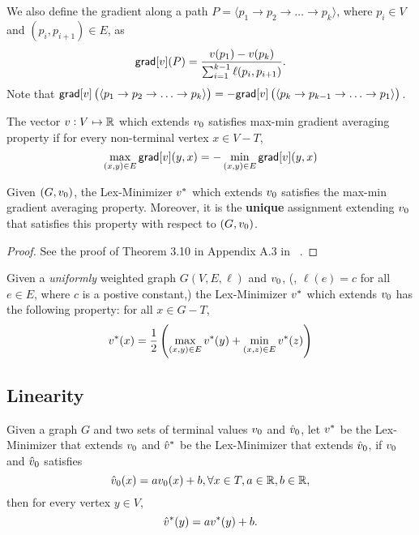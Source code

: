 \documentclass[12pt]{amsart}
\newcommand{\grad}{\ensuremath{\mathsf{grad}}}
\renewcommand{\path}[1]{\ensuremath{\langle {#1} \rangle}}
\begin{document}
We also define the gradient along a path $P = \path{p_1 \to p_2 \to \hdots \to p_k}$, where $p_i\in V$ and $(p_i, p_{i+1})\in E$, as $$\grad[\V{v}](P) = \frac{\V{v}(p_1) - \V{v}(p_k)}{\sum_{i=1}^{k-1}\ell(p_i, p_{i+1})}.$$ Note that $\grad[\V{v}]\paren{\path{p_1 \to p_2 \to \hdots \to p_k}} = -\grad[\V{v}]\paren{\path{p_k \to p_{k-1} \to \hdots \to p_1}}$.

\begin{definition}\label{def:maxmingradavgprop}
The vector $v: V\mapsto \mathbb R$ which extends $v_0$ satisfies max-min gradient averaging property if for every non-terminal vertex $x\in V-T$,
\begin{equation}\label{eq:maxmingradavgprop}
  \max_{(x,y)\in E}\grad[\V{v}](y,x) = -\min_{(x,y)\in E}\grad[\V{v}](y,x)
\end{equation}
\end{definition}

\begin{theorem}\label{thm:lexmaxminavgprop}
Given $(G, v_0)$, the Lex-Minimizer $v^*$ which extends $v_0$ satisfies the max-min gradient averaging property. Moreover, it is the \textbf{unique} assignment extending $v_0$ that satisfies this property with respect to $(G, v_0)$.
\end{theorem}
\begin{proof}
See the proof of Theorem 3.10 in Appendix A.3 in ~\cite{KRSS15}.
\end{proof}

\begin{corollary}\label{cor:lexunwtdprop}
Given a \emph{uniformly} weighted graph $G(V,E,\ell)$ and $v_0$, (\ie, $\ell(e) = c$ for all $e\in E$, where $c$ is a postive constant,) the Lex-Minimizer $v^*$ which extends $v_0$ has the following property: for all $x\in G - T$,
\begin{equation}\label{eq:lexunwtdprop}
  v^*(x) = \frac{1}{2} \left({ \max_{(x,y)\in E} v^*(y) + \min_{(x,z)\in E} v^*(z) }\right)
\end{equation}
\end{corollary}

\subsection{Linearity}
\begin{theorem}\label{thm:lexlinearity}
Given a graph $G$ and two sets of terminal values $v_0$ and $\hat{v}_0$, let $v^*$ be the Lex-Minimizer that extends $v_0$ and $\hat{v}^*$ be the Lex-Minimizer that extends $\hat{v}_0$, if $v_0$ and $\hat{v}_0$ satisfies $$\hat{v}_0(x) = av_0(x) + b, \forall x\in T, a\in \mathbb R, b\in \mathbb R,$$ then for every vertex $y\in V$, $$\hat{v}^*(y) = av^*(y) + b.$$
\end{theorem}
\end{document}
